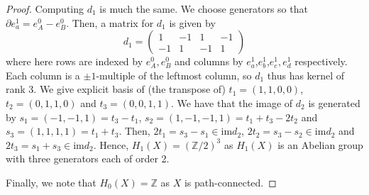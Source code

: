 \documentclass[english]{article}
\newcommand{\ZZ}{\mathbb{Z}}
\theoremstyle{remark}
\theoremstyle{definition}
\newcommand{\im}{\mathrm{im}}
\newcommand{\del}{\partial}
\begin{document}
\begin{proof}
	Computing $d_1$ is much the same. We choose generators so that $\del e_a^1=e_A^0-e_B^0$. Then, a matrix for $d_1$ is given by 
	$$d_1=\begin{pmatrix}
	1&-1&1&-1\\
	-1&1&-1&1
	\end{pmatrix}$$
	where here rows are indexed by $e_A^0,e_B^0$ and columns by $e_a^1$,$e_b^1$,$e_c^1,e_d^1$ respectively. Each column is a $\pm 1$-multiple of the leftmost column, so $d_1$ thus has kernel of rank 3. We give explicit basis of (the transpose of) $t_1=(1,1,0,0)$, $t_2=(0,1,1,0)$ and $t_3=(0,0,1,1)$. We have that the image of $d_2$ is generated by $s_1=(-1,-1,1)=t_3-t_1$, $s_2=(1,-1,-1,1)=t_1+t_3-2t_2$ and $s_3=(1,1,1,1)=t_1+t_3$. Then, $2t_1=s_3-s_1\in \im d_2$, $2t_2=s_3-s_2\in \im d_2$ and $2t_3=s_1+s_3\in \im d_2$. Hence, $H_1(X)=(\ZZ/2)^3$ as $H_1(X)$ is an Abelian group with three generators each of order 2. 
	
	Finally, we note that $H_0(X)=\ZZ$ as $X$ is path-connected. 
\end{proof}
\end{document}
